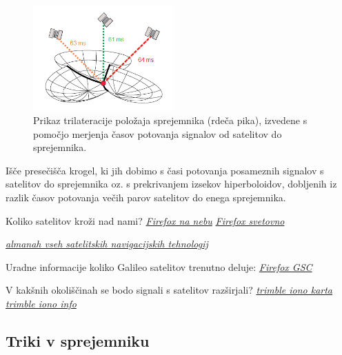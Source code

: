 \begin{figure}
	\vspace{-20pt}
	\begin{center}
		\includegraphics[width=0.48\textwidth]{Predavanja/05_SatLastPolozaj/figs/Trilateracija.png}
	\end{center}
	\vspace{-10pt}
	\caption{Prikaz trilateracije položaja sprejemnika (rdeča pika), izvedene s pomočjo merjenja časov potovanja signalov od satelitov do sprejemnika.}
	\label{Fig_Trilateracija}
	\vspace{-20pt}
\end{figure}

Išče presečišča krogel, ki jih dobimo s časi potovanja posameznih signalov s satelitov do sprejemnika oz. s prekrivanjem izsekov hiperboloidov, dobljenih iz razlik časov potovanja večih parov satelitov do enega sprejemnika. 



\vspace{80pt}
Koliko satelitov kroži nad nami? \href{www.trimble.com/gnssplanningonline/#/SkyPlot}{\textit{Firefox na nebu}} \href{http://www.trimble.com/gnssplanningonline/#/WorldView}{\textit{Firefox svetovno}}  

\href{http://gpsworld.com/the-almanac/}{\textit{almanah vseh satelitskih navigacijskih tehnologij}}  

Uradne informacije koliko Galileo satelitov trenutno deluje: \href{https://www.gsc-europa.eu/system-status/Constellation-Information}{\textit{Firefox GSC}}  

V kakšnih okoliščinah se bodo signali s satelitov razširjali? \href{http://www.trimble.com/gnssplanningonline/#/IonoMap}{\textit{trimble iono karta}} 
\href{http://www.trimble.com/gnssplanningonline/#/IonoInformation}{\textit{trimble iono info}} 


\subsection{Triki v sprejemniku}
\label{Gnss_Polozaj:Triki}


